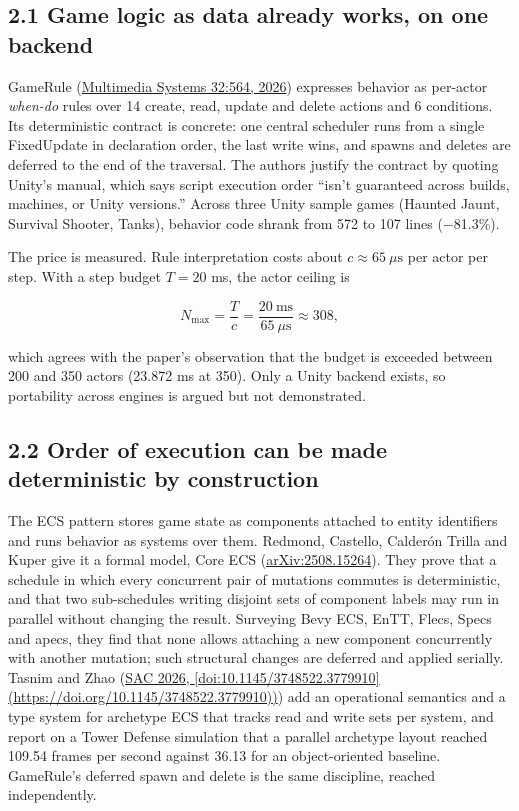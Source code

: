 \documentclass[10pt,letterpaper]{article}
\newcounter{none}
\begin{document}
\subsection{2.1 Game logic as data already works, on one
backend}\label{game-logic-as-data-already-works-on-one-backend}

GameRule (\href{https://doi.org/10.1007/s00530-026-02629-8}{Multimedia
Systems 32:564, 2026}) expresses behavior as per-actor \emph{when-do}
rules over 14 create, read, update and delete actions and 6 conditions.
Its deterministic contract is concrete: one central scheduler runs from
a single FixedUpdate in declaration order, the last write wins, and
spawns and deletes are deferred to the end of the traversal. The authors
justify the contract by quoting Unity's manual, which says script
execution order ``isn't guaranteed across builds, machines, or Unity
versions.'' Across three Unity sample games (Haunted Jaunt, Survival
Shooter, Tanks), behavior code shrank from 572 to 107 lines (−81.3\%).

The price is measured. Rule interpretation costs about
\(c \approx 65\ \mu\text{s}\) per actor per step. With a step budget
\(T = 20\) ms, the actor ceiling is

\[N_{\max} = \frac{T}{c} = \frac{20\ \text{ms}}{65\ \mu\text{s}} \approx 308,\]

which agrees with the paper's observation that the budget is exceeded
between 200 and 350 actors (23.872 ms at 350). Only a Unity backend
exists, so portability across engines is argued but not demonstrated.

\subsection{2.2 Order of execution can be made deterministic by
construction}\label{order-of-execution-can-be-made-deterministic-by-construction}

The ECS pattern stores game state as components attached to entity
identifiers and runs behavior as systems over them. Redmond, Castello,
Calderón Trilla and Kuper give it a formal model, Core ECS
(\href{https://arxiv.org/abs/2508.15264}{arXiv:2508.15264}). They prove
that a schedule in which every concurrent pair of mutations commutes is
deterministic, and that two sub-schedules writing disjoint sets of
component labels may run in parallel without changing the result.
Surveying Bevy ECS, EnTT, Flecs, Specs and apecs, they find that none
allows attaching a new component concurrently with another mutation;
such structural changes are deferred and applied serially. Tasnim and
Zhao
(\href{https://doi.org/10.1145/3748522.3779910\%5D(https://doi.org/10.1145/3748522.3779910)}{SAC
2026,
{[}doi:10.1145/3748522.3779910{]}(https://doi.org/10.1145/3748522.3779910))})
add an operational semantics and a type system for archetype ECS that
tracks read and write sets per system, and report on a Tower Defense
simulation that a parallel archetype layout reached 109.54 frames per
second against 36.13 for an object-oriented baseline. GameRule's
deferred spawn and delete is the same discipline, reached independently.
\end{document}
